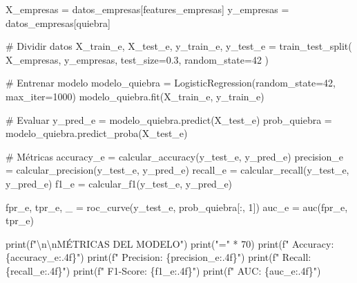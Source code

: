\documentclass[
  doc,
  floatsintext,
  longtable,
  a4paper,
  nolmodern,
  notxfonts,
  notimes,
  12pt,
  colorlinks=true,linkcolor=blue,citecolor=blue,urlcolor=blue]{apa7}
\newenvironment{Shaded}{\begin{snugshade}}{\end{snugshade}}
\newcommand{\BuiltInTok}[1]{\textcolor[rgb]{0.00,0.23,0.31}{#1}}
\newcommand{\CharTok}[1]{\textcolor[rgb]{0.13,0.47,0.30}{#1}}
\newcommand{\CommentTok}[1]{\textcolor[rgb]{0.37,0.37,0.37}{#1}}
\newcommand{\DecValTok}[1]{\textcolor[rgb]{0.68,0.00,0.00}{#1}}
\newcommand{\FloatTok}[1]{\textcolor[rgb]{0.68,0.00,0.00}{#1}}
\newcommand{\NormalTok}[1]{\textcolor[rgb]{0.00,0.23,0.31}{#1}}
\newcommand{\OperatorTok}[1]{\textcolor[rgb]{0.37,0.37,0.37}{#1}}
\newcommand{\SpecialCharTok}[1]{\textcolor[rgb]{0.37,0.37,0.37}{#1}}
\newcommand{\SpecialStringTok}[1]{\textcolor[rgb]{0.13,0.47,0.30}{#1}}
\newcommand{\StringTok}[1]{\textcolor[rgb]{0.13,0.47,0.30}{#1}}
\begin{document}
\begin{Shaded}
\begin{Highlighting}[]
\NormalTok{X\_empresas }\OperatorTok{=}\NormalTok{ datos\_empresas[features\_empresas]}
\NormalTok{y\_empresas }\OperatorTok{=}\NormalTok{ datos\_empresas[}\StringTok{\textquotesingle{}quiebra\textquotesingle{}}\NormalTok{]}

\CommentTok{\# Dividir datos}
\NormalTok{X\_train\_e, X\_test\_e, y\_train\_e, y\_test\_e }\OperatorTok{=}\NormalTok{ train\_test\_split(}
\NormalTok{    X\_empresas, y\_empresas, test\_size}\OperatorTok{=}\FloatTok{0.3}\NormalTok{, random\_state}\OperatorTok{=}\DecValTok{42}
\NormalTok{)}

\CommentTok{\# Entrenar modelo}
\NormalTok{modelo\_quiebra }\OperatorTok{=}\NormalTok{ LogisticRegression(random\_state}\OperatorTok{=}\DecValTok{42}\NormalTok{, max\_iter}\OperatorTok{=}\DecValTok{1000}\NormalTok{)}
\NormalTok{modelo\_quiebra.fit(X\_train\_e, y\_train\_e)}

\CommentTok{\# Evaluar}
\NormalTok{y\_pred\_e }\OperatorTok{=}\NormalTok{ modelo\_quiebra.predict(X\_test\_e)}
\NormalTok{prob\_quiebra }\OperatorTok{=}\NormalTok{ modelo\_quiebra.predict\_proba(X\_test\_e)}

\CommentTok{\# Métricas}
\NormalTok{accuracy\_e }\OperatorTok{=}\NormalTok{ calcular\_accuracy(y\_test\_e, y\_pred\_e)}
\NormalTok{precision\_e }\OperatorTok{=}\NormalTok{ calcular\_precision(y\_test\_e, y\_pred\_e)}
\NormalTok{recall\_e }\OperatorTok{=}\NormalTok{ calcular\_recall(y\_test\_e, y\_pred\_e)}
\NormalTok{f1\_e }\OperatorTok{=}\NormalTok{ calcular\_f1(y\_test\_e, y\_pred\_e)}

\NormalTok{fpr\_e, tpr\_e, \_ }\OperatorTok{=}\NormalTok{ roc\_curve(y\_test\_e, prob\_quiebra[:, }\DecValTok{1}\NormalTok{])}
\NormalTok{auc\_e }\OperatorTok{=}\NormalTok{ auc(fpr\_e, tpr\_e)}

\BuiltInTok{print}\NormalTok{(}\SpecialStringTok{f"}\CharTok{\textbackslash{}n\textbackslash{}n}\SpecialStringTok{MÉTRICAS DEL MODELO"}\NormalTok{)}
\BuiltInTok{print}\NormalTok{(}\StringTok{"="} \OperatorTok{*} \DecValTok{70}\NormalTok{)}
\BuiltInTok{print}\NormalTok{(}\SpecialStringTok{f"  Accuracy:  }\SpecialCharTok{\{}\NormalTok{accuracy\_e}\SpecialCharTok{:.4f\}}\SpecialStringTok{"}\NormalTok{)}
\BuiltInTok{print}\NormalTok{(}\SpecialStringTok{f"  Precision: }\SpecialCharTok{\{}\NormalTok{precision\_e}\SpecialCharTok{:.4f\}}\SpecialStringTok{"}\NormalTok{)}
\BuiltInTok{print}\NormalTok{(}\SpecialStringTok{f"  Recall:    }\SpecialCharTok{\{}\NormalTok{recall\_e}\SpecialCharTok{:.4f\}}\SpecialStringTok{"}\NormalTok{)}
\BuiltInTok{print}\NormalTok{(}\SpecialStringTok{f"  F1{-}Score:  }\SpecialCharTok{\{}\NormalTok{f1\_e}\SpecialCharTok{:.4f\}}\SpecialStringTok{"}\NormalTok{)}
\BuiltInTok{print}\NormalTok{(}\SpecialStringTok{f"  AUC:       }\SpecialCharTok{\{}\NormalTok{auc\_e}\SpecialCharTok{:.4f\}}\SpecialStringTok{"}\NormalTok{)}


\end{Highlighting}
\end{Shaded}
\end{document}
